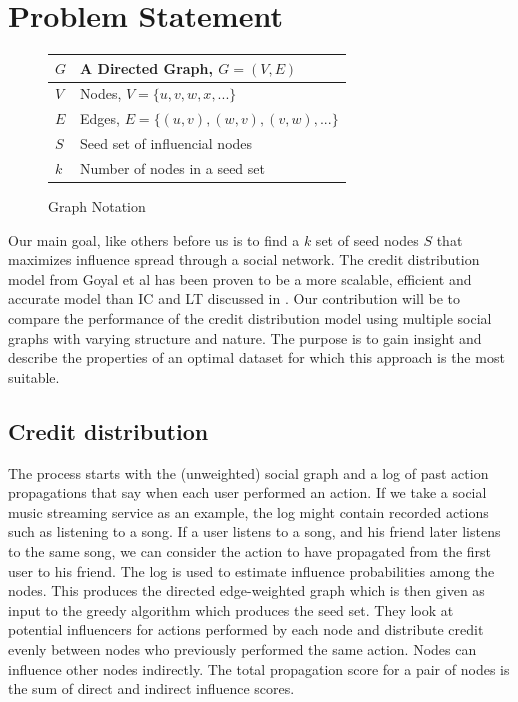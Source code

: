 \documentclass{acm_proc_article-sp}
\begin{document}
\section{Problem Statement}

\begin{figure}
	\centering
	\begin{tabulary}{\linewidth}{|l|L|}
			\hline
			$G$ & A Directed Graph, $G = (V,E)$ \\\hline
			$V$ & Nodes, $V = \{u,v,w,x,...\}$ \\\hline
			$E$ & Edges, $E = \{(u, v),(w, v),(v,w),...\}$ \\\hline
			$S$ & Seed set of influencial nodes \\\hline
			$k$ & Number of nodes in a seed set \\\hline
	\end{tabulary}
	\caption{Graph Notation}
	\label{general-notation}
\end{figure}

Our main goal, like others before us is to find a $k$ set of seed nodes $S$ that maximizes influence spread through a social network. The credit distribution model from Goyal et al has been proven to be a more scalable, efficient and accurate model than IC and LT discussed in \cite{kempe:maxspread}. Our contribution will be to compare the performance of the credit distribution model using multiple social graphs with varying structure and nature. The purpose is to gain insight and describe the properties of an optimal dataset for which this approach is the most suitable.

\subsection{Credit distribution}

The process starts with the (unweighted) social graph and a log of past action propagations that say when each user performed an action. If we take a social music streaming service as an example, the log might contain recorded actions such as listening to a song. If a user listens to a song, and his friend later listens to the same song, we can consider the action to have propagated from the first user to his friend. The log is used to estimate influence probabilities among the nodes. This produces the directed edge-weighted graph which is then given as input to the greedy algorithm which produces the seed set. They look at potential influencers for actions performed by each node and distribute credit evenly between nodes who previously performed the same action. Nodes can influence other nodes indirectly. The total propagation score for a pair of nodes is the sum of direct and indirect influence scores.
\end{document}
